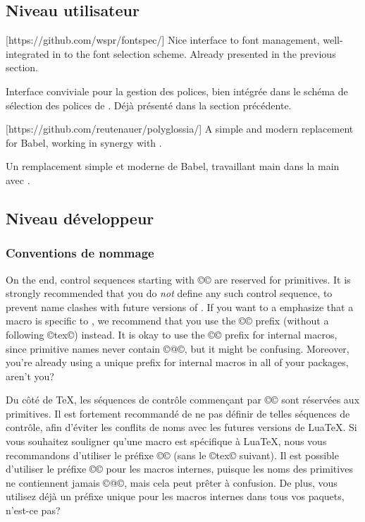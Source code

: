 \documentclass{lltxdoc}
\begin{document}
\subsection{Niveau utilisateur}

[https://github.com/wspr/fontspec/]
Nice interface to font management, well-integrated in to the \latex font
selection scheme. Already presented in the previous section.

Interface conviviale pour la gestion des polices, bien intégrée dans le schéma de sélection des polices de \latex. Déjà présenté dans la section précédente.

[https://github.com/reutenauer/polyglossia/]
A simple and modern replacement for Babel, working in synergy with .

Un remplacement simple et moderne de Babel, travaillant main dans la main avec .

\subsection{Niveau développeur}

\subsubsection{Conventions de nommage}

On the \tex end, control sequences starting with ©\luatex© are reserved for
primitives. It is strongly recommended that you do \emph{not} define any such
control sequence, to prevent name clashes with future versions of \luatex. If
you want to a emphasize that a macro is specific to \luatex, we recommend that
you use the ©\lua© prefix (without a following ©tex©) instead. It is okay to
use the ©\luatex@© prefix for internal macros, since primitive names never
contain ©@©, but it might be confusing. Moreover, you're already using a
unique prefix for internal macros in all of your packages, aren't you?

Du côté de TeX, les séquences de contrôle commençant par ©\luatex© sont réservées aux primitives. Il est fortement recommandé de ne pas définir de telles séquences de contrôle, afin d'éviter les conflits de noms avec les futures versions de LuaTeX. Si vous souhaitez souligner qu'une macro est spécifique à LuaTeX, nous vous recommandons d'utiliser le préfixe ©\lua© (sans le ©tex© suivant). Il est possible d'utiliser le préfixe ©\luatex@© pour les macros internes, puisque les noms des primitives ne contiennent jamais ©@©, mais cela peut prêter à confusion. De plus, vous utilisez déjà un préfixe unique pour les macros internes dans tous vos paquets, n'est-ce pas?
\end{document}

